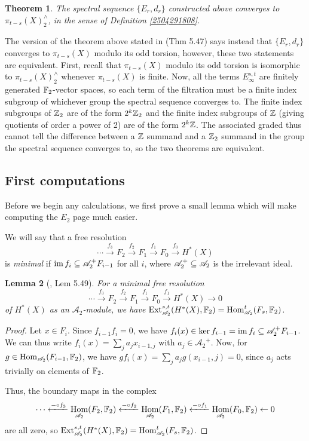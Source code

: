 \documentclass[11pt, titlepage]{article} %
\def\bb{\ensuremath\mathbb}
\def\subq{\ensuremath\subseteq}
\def\inte{\ensuremath\mathbb{Z}}
\def\A{\ensuremath{\mathscr{A}_2}}
\DeclareMathOperator{\Ext}{Ext}
\DeclareMathOperator{\Hom}{Hom}
\DeclareMathOperator{\im}{im}
\numberwithin{equation}{subsection}
\theoremstyle{plain}
\newtheorem{theorem}{Theorem}[subsection]
\newtheorem{lemma}[theorem]{Lemma}
\theoremstyle{definition}
\begin{document}
\begin{theorem}\label{2504081125}
The spectral sequence \(\{E_r, d_r\}\) constructed above converges to \(\pi_{t-s}(X)^\wedge_2\), in the sense of Definition \ref{2504291808}. 
\end{theorem}

The version of the theorem above stated in \autocite{hatcher5} (Thm 5.47) says instead that \(\{E_r, d_r\}\) converges to \(\pi_{t-s}(X)\) modulo its odd torsion, however, these two statements are equivalent. First, recall that \(\pi_{t-s}(X)\) modulo its odd torsion is isomorphic to \(\pi_{t-s}(X)^\wedge_2\) whenever \(\pi_{t-s}(X)\) is finite. Now, all the terms \(E_\infty^{s,t}\) are finitely generated \(\bb{F}_2\)-vector spaces, so each term of the filtration must be a finite index subgroup of whichever group the spectral sequence converges to. The finite index subgroups of \(\inte_2\) are of the form \(2^k\inte_2\) 
and the finite index subgroups of \(\inte\) (giving quotients of order a power of 2) are of the form \(2^k\inte\). The associated graded thus cannot tell the difference between a \(\inte\) summand and a \(\inte_2\) summand in the group the spectral sequence converges to, so the two theorems are equivalent.

\subsection{First computations}\label{2504291249}

Before we begin any calculations, we first prove a small lemma which will make computing the \(E_2\) page much easier. 

We will say that a free resolution
\[\cdots \xrightarrow{f_3} F_2 \xrightarrow{f_2} F_1 \xrightarrow{f_1} F_0 \xrightarrow{f_0} H^*(X)\]
is \textit{minimal} if \(\im f_i \subq \A^+F_{i-1}\) for all \(i\), where \(\A^+\subq \A\) is the irrelevant ideal. 

\begin{lemma}[{\autocite{hatcher5}, Lem 5.49}]\label{2503171645shutupitsbeenalongterm}
For a minimal free resolution 
\[\cdots \xrightarrow{f_3} F_2 \xrightarrow{f_2} F_1 \xrightarrow{f_1} F_0 \xrightarrow{f_1} H^*(X) \to 0\]
of \(H^*(X)\) as an \(\A\)-module, we have \(\Ext_{\A}^{s,t}(H^*(X), \bb{F}_2)=\Hom^t_{\A}(F_s, \bb{F}_2)\).
\end{lemma}

\begin{proof}
Let \(x \in F_i\). Since \(f_{i-1}f_i=0\), we have \(f_i(x)\in \ker f_{i-1}=\im f_i\subq \A^+F_{i-1}\). We can thus write \(f_i(x)=\sum_j a_j x_{i-1,j}\) with \(a_j \in \A^+\). Now, for \(g \in \Hom_{\A}(F_{i-1}, \bb{F}_2)\), we have \(gf_i(x)=\sum_j a_j g(x_{i-1},j)=0\), since \(a_j\) acts trivially on elements of \(\bb{F}_2\). 

Thus, the boundary maps in the complex
\[\cdots \xleftarrow{-\circ f_3}\Hom_{\A}(F_2, \bb{F}_2) \xleftarrow{-\circ f_2}\Hom_{\A}(F_1, \bb{F}_2) \xleftarrow{-\circ f_1} \Hom_{\A}(F_0, \bb{F}_2)\leftarrow 0\]
are all zero, so \(\Ext_{\A}^{s,t}(H^*(X), \bb{F}_2)=\Hom^t_{\A}(F_s, \bb{F}_2)\).
\end{proof}
\end{document}
